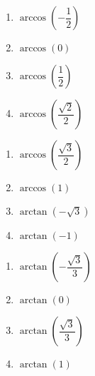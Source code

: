 \documentclass{ximera}
\begin{document}
\begin{multicols}{4}

\begin{enumerate}

\setcounter{enumi}{\value{HW}}

\item $\arccos \left( -\dfrac{1}{2} \right)$ 
\item $\arccos \left( 0 \right)$ 
\item $\arccos \left( \dfrac{1}{2} \right)$ 
\item $\arccos \left( \dfrac{\sqrt{2}}{2} \right)$

\setcounter{HW}{\value{enumi}}

\end{enumerate}

\end{multicols}

\begin{multicols}{4}

\begin{enumerate}

\setcounter{enumi}{\value{HW}}

\item $\arccos \left( \dfrac{\sqrt{3}}{2} \right)$
\item $\arccos \left( 1 \right)$ 
\item $\arctan \left( -\sqrt{3} \right)$ 
\item $\arctan \left( -1 \right)$ 

\setcounter{HW}{\value{enumi}}

\end{enumerate}

\end{multicols}

\begin{multicols}{4}

\begin{enumerate}

\setcounter{enumi}{\value{HW}}

\item $\arctan \left( -\dfrac{\sqrt{3}}{3} \right)$
\item $\arctan \left( 0 \right)$ 
\item $\arctan \left( \dfrac{\sqrt{3}}{3} \right)$
\item $\arctan \left( 1 \right)$ 

\setcounter{HW}{\value{enumi}}

\end{enumerate}

\end{multicols}
\end{document}

